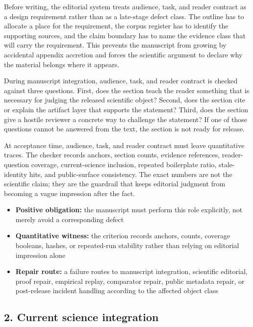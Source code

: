 Before writing, the editorial system treats audience, task, and reader contract as a design requirement rather than as a late-stage defect class. The outline has to allocate a place for the requirement, the corpus register has to identify the supporting sources, and the claim boundary has to name the evidence class that will carry the requirement. This prevents the manuscript from growing by accidental appendix accretion and forces the scientific argument to declare why the material belongs where it appears.


During manuscript integration, audience, task, and reader contract is checked against three questions. First, does the section teach the reader something that is necessary for judging the released scientific object? Second, does the section cite or explain the artifact layer that supports the statement? Third, does the section give a hostile reviewer a concrete way to challenge the statement? If one of those questions cannot be answered from the text, the section is not ready for release.


At acceptance time, audience, task, and reader contract must leave quantitative traces. The checker records anchors, section counts, evidence references, reader-question coverage, current-science inclusion, repeated boilerplate ratio, stale-identity hits, and public-surface consistency. The exact numbers are not the scientific claim; they are the guardrail that keeps editorial judgment from becoming a vague impression after the fact.


\begin{itemize}[leftmargin=1.8em]

\item \textbf{Positive obligation:} the manuscript must perform this role explicitly, not merely avoid a corresponding defect

\item \textbf{Quantitative witness:} the criterion records anchors, counts, coverage booleans, hashes, or repeated-run stability rather than relying on editorial impression alone

\item \textbf{Repair route:} a failure routes to manuscript integration, scientific editorial, proof repair, empirical replay, comparator repair, public metadata repair, or post-release incident handling according to the affected object class

\end{itemize}

\subsection{2. Current science integration}

